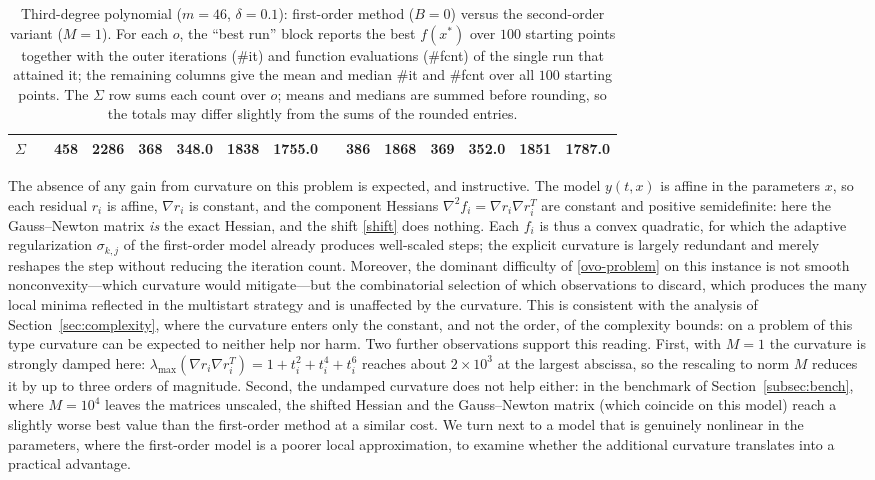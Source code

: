 \documentclass[11pt]{article}
\begin{document}
\begin{table}[ht!]
{\begin{tabular}{c ccc cc cc ccc cc cc}
\hline
$\Sigma$ & & 458 & 2286 & 368 & 348.0 & 1838 & 1755.0 & & 386 & 1868 & 369 & 352.0 & 1851 & 1787.0 \\
\hline
\end{tabular}%
}
\caption{Third-degree polynomial ($m=46$, $\delta=0.1$): first-order method
($B=0$) versus the second-order variant ($M=1$). For each $o$, the ``best run''
block reports the best $f(x^*)$ over $100$ starting points together with the
outer iterations (\#it) and function evaluations (\#fcnt) of the single run that
attained it; the remaining columns give the mean and median \#it and \#fcnt over
all $100$ starting points. The $\Sigma$ row sums each count over $o$; means and medians
are summed before rounding, so the totals may differ slightly from the sums of
the rounded entries.}
\label{tab:poly}
\end{table}

The absence of any gain from curvature on this problem is expected, and
instructive. The model $y(t,x)$ is affine in the parameters $x$, so each
residual $r_i$ is affine, $\nabla r_i$ is constant, and the component Hessians
$\nabla^2 f_i=\nabla r_i\nabla r_i^T$ are constant and positive semidefinite:
here the Gauss--Newton matrix \emph{is} the exact Hessian, and the shift
\eqref{shift} does nothing. Each $f_i$ is thus a convex
quadratic, for which the adaptive regularization $\sigma_{k,j}$ of the
first-order model already produces well-scaled steps; the explicit curvature is
largely redundant and merely reshapes the step without reducing the iteration
count. Moreover, the dominant difficulty of \eqref{ovo-problem} on this
instance is not smooth nonconvexity---which curvature would mitigate---but the
combinatorial selection of which observations to discard, which produces the
many local minima reflected in the multistart strategy and is unaffected by
the curvature. This is consistent with the analysis of Section~\ref{sec:complexity},
where the curvature enters only the constant, and not the order, of the complexity
bounds: on a problem of this type curvature can be expected to neither help nor
harm. Two further observations support this reading. First, with $M=1$ the
curvature is strongly damped here: $\lambda_{\max}(\nabla r_i\nabla r_i^T) =
1+t_i^2+t_i^4+t_i^6$ reaches about $2\times10^3$ at the largest abscissa, so
the rescaling to norm $M$ reduces it by up to three orders of magnitude. Second,
the undamped curvature does not help either: in the benchmark of
Section~\ref{subsec:bench}, where $M=10^4$ leaves the matrices unscaled, the
shifted Hessian and the Gauss--Newton matrix (which coincide on this model)
reach a slightly worse best value than the first-order method at a similar
cost. We turn next to a model that is genuinely nonlinear in the parameters, where
the first-order model is a poorer local approximation, to examine whether the
additional curvature translates into a practical advantage.
\end{document}
